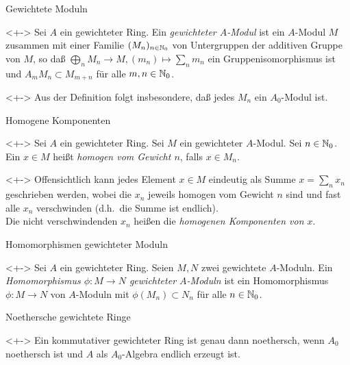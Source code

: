 \begin{frame}{Gewichtete Moduln}
	\begin{definition}<+->
		Sei \(A\) ein gewichteter Ring. Ein \emph{gewichteter \(A\)-Modul} ist
		ein \(A\)-Modul \(M\) zusammen mit einer Familie \((M_n)_{n \in \mathbb N_0}\)
		von Untergruppen der additiven Gruppe von \(M\), so daß
		\(\bigoplus\limits_n M_n \to M, (m_n) \mapsto \sum\limits_n m_n\)
		ein Gruppenisomorphismus ist und \(A_m M_n \subset M_{m + n}\)
		für alle \(m, n \in \mathbb N_0\).
	\end{definition}
	\begin{visibleenv}<+->
		Aus der Definition folgt insbesondere, daß jedes \(M_n\) ein \(A_0\)-Modul
		ist.
	\end{visibleenv}
\end{frame}

\begin{frame}{Homogene Komponenten}
	\begin{definition}<+->
		Sei \(A\) ein gewichteter Ring. Sei \(M\) ein gewichteter \(A\)-Modul. 
		Sei \(n \in \mathbb N_0\). Ein	\(x \in M\) heißt \emph{homogen vom
		Gewicht \(n\)}, falls \(x \in M_n\).
	\end{definition}
	\begin{visibleenv}<+->
		Offensichtlich kann jedes Element \(x \in M\) eindeutig als Summe
		\(x = \sum\limits_n x_n\) geschrieben werden, wobei die \(x_n\) jeweils
		homogen vom Gewicht \(n\) sind und fast alle \(x_n\) verschwinden
		(d.h.\ die Summe ist endlich).
		\\
		Die nicht verschwindenden \(x_n\) heißen die \emph{homogenen Komponenten
		von \(x\)}.
	\end{visibleenv}
\end{frame}

\begin{frame}{Homomorphismen gewichteter Moduln}
	\begin{definition}<+->
		Sei \(A\) ein gewichteter Ring. Seien \(M, N\) zwei gewichtete \(A\)-Moduln.
		Ein \emph{Homomorphismus \(\phi\colon M \to N\) gewichteter \(A\)-Moduln}
		ist ein Homomorphismus \(\phi\colon M \to N\) von \(A\)-Moduln mit
		\(\phi(M_n) \subset N_n\) für alle \(n \in \mathbb N_0\).
	\end{definition}
\end{frame}

\begin{frame}{Noethersche gewichtete Ringe}
	\begin{proposition}<+->
		Ein kommutativer gewichteter Ring ist genau dann noethersch, wenn
		\(A_0\) noethersch ist und \(A\) als \(A_0\)-Algebra endlich erzeugt ist.
	\end{proposition}
\end{frame}

